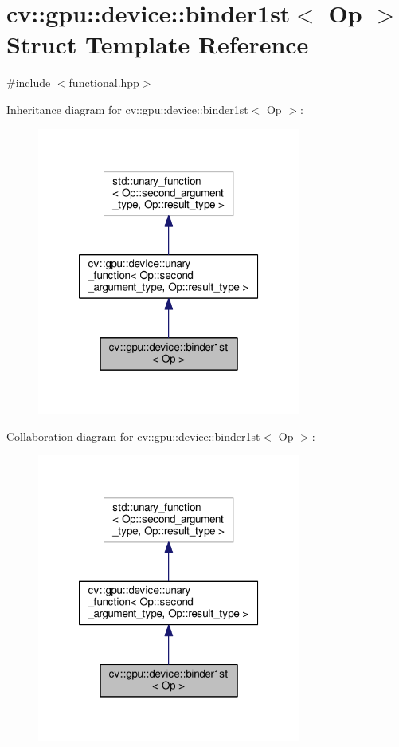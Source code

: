\hypertarget{structcv_1_1gpu_1_1device_1_1binder1st}{\section{cv\-:\-:gpu\-:\-:device\-:\-:binder1st$<$ Op $>$ Struct Template Reference}
\label{structcv_1_1gpu_1_1device_1_1binder1st}
}


{\ttfamily \#include $<$functional.\-hpp$>$}



Inheritance diagram for cv\-:\-:gpu\-:\-:device\-:\-:binder1st$<$ Op $>$\-:\nopagebreak
\begin{figure}[H]
\begin{center}
\leavevmode
\includegraphics[width=246pt]{structcv_1_1gpu_1_1device_1_1binder1st__inherit__graph}
\end{center}
\end{figure}


Collaboration diagram for cv\-:\-:gpu\-:\-:device\-:\-:binder1st$<$ Op $>$\-:\nopagebreak
\begin{figure}[H]
\begin{center}
\leavevmode
\includegraphics[width=246pt]{structcv_1_1gpu_1_1device_1_1binder1st__coll__graph}
\end{center}
\end{figure}
